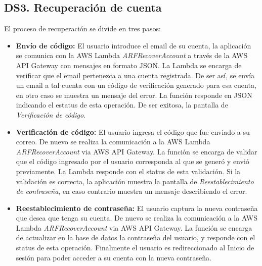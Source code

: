 \subsection{DS3. Recuperación de cuenta}
El proceso de recuperación se divide en tres pasos:
\begin{itemize}
	\item \textbf{Envío de código:} El usuario introduce el email de su cuenta, la aplicación se comunica con la AWS Lambda \textit{ARFRecoverAccount} a través de la AWS API Gateway con mensajes en formato JSON. La Lambda se encarga de verificar que el email pertenezca a una cuenta registrada. De ser así, se envía un email a tal cuenta con un código de verificación generado para esa cuenta, en otro caso se muestra un mensaje del error. La función responde en JSON indicando el estatus de esta operación. De ser exitosa, la pantalla de \textit{Verificación de código}.
	\item \textbf{Verificación de código:} El usuario ingresa el código que fue enviado a su correo. De nuevo se realiza la comunicación a la AWS Lambda \textit{ARFRecoverAccount} via AWS API Gateway. La función se encarga de validar que el código ingresado por el usuario corresponda al que se generó y envió previamente. La Lambda responde con el status de esta validación. Si la validación es correcta, la aplicación muestra la pantalla de \textit{Reestablecimiento de contraseña}, en caso contrario muestra un mensaje describiendo el error.
	\item \textbf{Reestablecimiento de contraseña:} El usuario captura la nueva contraseña que desea que tenga su cuenta. De nuevo se realiza la comunicación a la AWS Lambda \textit{ARFRecoverAccount} via AWS API Gateway. La función se encarga de actualizar en la base de datos la contraseña del usuario, y responde con el status de esta operación. Finalmente el usuario es redireccionado al Inicio de sesión para poder acceder a su cuenta con la nueva contraseña.
\end{itemize}

